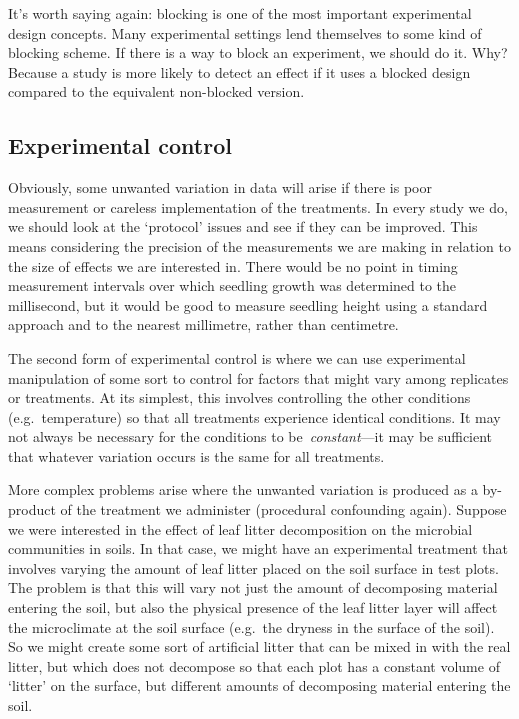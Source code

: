 \documentclass[
]{book}
\begin{document}
It's worth saying again: blocking is one of the most important experimental design concepts. Many experimental settings lend themselves to some kind of blocking scheme. If there is a way to block an experiment, we should do it. Why? Because a study is more likely to detect an effect if it uses a blocked design compared to the equivalent non-blocked version.

\hypertarget{experimental-control}{%
\subsection{Experimental control}\label{experimental-control}}

Obviously, some unwanted variation in data will arise if there is poor measurement or careless implementation of the treatments. In every study we do, we should look at the `protocol' issues and see if they can be improved. This means considering the precision of the measurements we are making in relation to the size of effects we are interested in. There would be no point in timing measurement intervals over which seedling growth was determined to the millisecond, but it would be good to measure seedling height using a standard approach and to the nearest millimetre, rather than centimetre.

The second form of experimental control is where we can use experimental manipulation of some sort to control for factors that might vary among replicates or treatments. At its simplest, this involves controlling the other conditions (e.g.~temperature) so that all treatments experience identical conditions. It may not always be necessary for the conditions to be~\emph{constant}---it may be sufficient that whatever variation occurs is the same for all treatments.

More complex problems arise where the unwanted variation is produced as a by-product of the treatment we administer (procedural confounding again). Suppose we were interested in the effect of leaf litter decomposition on the microbial communities in soils. In that case, we might have an experimental treatment that involves varying the amount of leaf litter placed on the soil surface in test plots. The problem is that this will vary not just the amount of decomposing material entering the soil, but also the physical presence of the leaf litter layer will affect the microclimate at the soil surface (e.g.~the dryness in the surface of the soil). So we might create some sort of artificial litter that can be mixed in with the real litter, but which does not decompose so that each plot has a constant volume of `litter' on the surface, but different amounts of decomposing material entering the soil.
\end{document}
